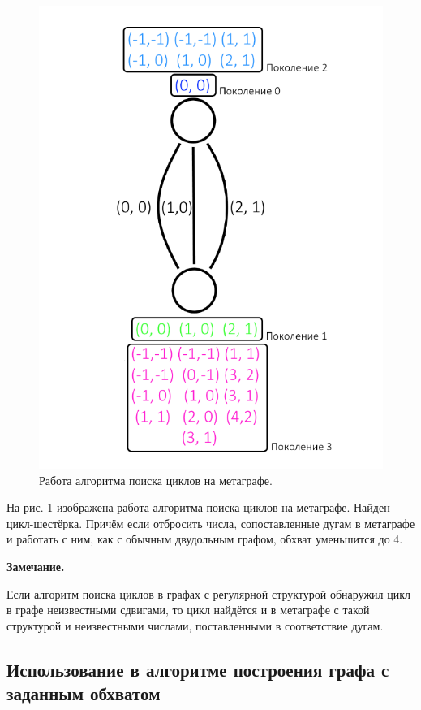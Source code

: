 \documentclass[14pt]{mmcs_article}
\begin{document}
\begin{figure}[H]
  \centering
  \includegraphics[scale=0.5]{Fig_9.png}
  \caption{ Работа алгоритма поиска циклов на метаграфе. }
  \label{metagraph:2}
\end{figure}

На рис. \ref{metagraph:2} изображена работа алгоритма поиска циклов на метаграфе. Найден цикл-шестёрка. Причём если отбросить числа, сопоставленные дугам в метаграфе и работать с ним, как с обычным двудольным графом, обхват уменьшится до 4.

\textbf{Замечание.}

Если алгоритм поиска циклов в графах с регулярной структурой обнаружил цикл в графе неизвестными сдвигами, то цикл найдётся и в метаграфе с такой структурой и неизвестными числами, поставленными в соответствие дугам.

\subsection{Использование в алгоритме построения графа с заданным обхватом}
\end{document}
